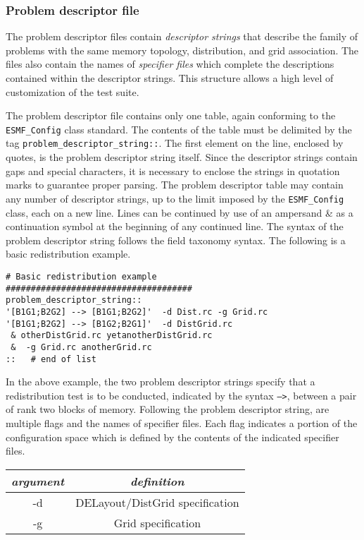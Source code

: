 \subsubsection{Problem descriptor file}
\label{sec:harness_problemdescriptorfile}

The problem descriptor files contain \textit{descriptor strings} that describe the family 
of problems with the same memory topology, distribution, and grid association. 
The files also contain the names of \textit{specifier files} which complete the descriptions 
contained within the descriptor strings. This structure allows a high level of customization of the test suite.

The problem descriptor file contains only one table, again conforming to the \texttt{ESMF\_Config} class standard. 
The contents of the table must be delimited by the tag \texttt{problem\_descriptor\_string::}. 
The first element on the line, enclosed by quotes, is the problem descriptor string itself. 
Since the descriptor strings contain gaps and special characters, it is necessary 
to enclose the strings in quotation marks to guarantee proper parsing. 
The problem descriptor table may contain any number of descriptor strings, 
up to the limit imposed by the \texttt{ESMF\_Config} class, each on a new line. 
Lines can be continued by use of an ampersand {\&} as a continuation symbol 
at the beginning of any continued line. 
The syntax of the problem descriptor string follows the field taxonomy syntax. 
The following is a basic redistribution example.
\begin{verbatim}
# Basic redistribution example
#####################################
problem_descriptor_string::
'[B1G1;B2G2] --> [B1G1;B2G2]'  -d Dist.rc -g Grid.rc 
'[B1G1;B2G2] --> [B1G2;B2G1]'  -d DistGrid.rc 
 & otherDistGrid.rc yetanotherDistGrid.rc
 &  -g Grid.rc anotherGrid.rc  
::   # end of list
\end{verbatim}
In the above example, the two problem descriptor strings specify that a redistribution test 
is to be conducted, indicated by the syntax  \texttt{-->}, between a pair of rank two blocks of memory. 
Following the problem descriptor string, are multiple flags and the names of specifier files. 
Each flag indicates a portion of the configuration space which is defined by the contents 
of the indicated specifier files.  
\begin{center}
\begin{tabular}{| c | c |} \hline
{\em argument } & {\em definition} \\
\hline \hline
-d & DELayout/DistGrid specification \\
-g & Grid specification \\
\hline 
\end{tabular}
\end{center}
